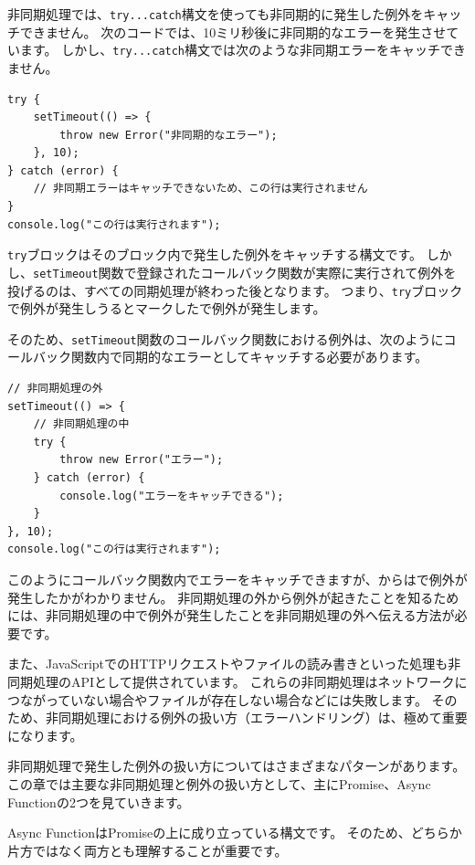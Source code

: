 非同期処理では、\texttt{try...catch}構文を使っても非同期的に発生した例外をキャッチできません。
次のコードでは、10ミリ秒後に非同期的なエラーを発生させています。
しかし、\texttt{try...catch}構文では次のような非同期エラーをキャッチできません。

\begin{lstlisting}
try {
    setTimeout(() => {
        throw new Error("非同期的なエラー");
    }, 10);
} catch (error) {
    // 非同期エラーはキャッチできないため、この行は実行されません
}
console.log("この行は実行されます");
\end{lstlisting}

\texttt{try}ブロックはそのブロック内で発生した例外をキャッチする構文です。
しかし、\texttt{setTimeout}関数で登録されたコールバック関数が実際に実行されて例外を投げるのは、すべての同期処理が終わった後となります。
つまり、\texttt{try}ブロックで例外が発生しうるとマークした\textbf{}で例外が発生します。

そのため、\texttt{setTimeout}関数のコールバック関数における例外は、次のようにコールバック関数内で同期的なエラーとしてキャッチする必要があります。

\begin{lstlisting}
// 非同期処理の外
setTimeout(() => {
    // 非同期処理の中
    try {
        throw new Error("エラー");
    } catch (error) {
        console.log("エラーをキャッチできる");
    }
}, 10);
console.log("この行は実行されます");
\end{lstlisting}

このようにコールバック関数内でエラーをキャッチできますが、\textbf{}からは\textbf{}で例外が発生したかがわかりません。
非同期処理の外から例外が起きたことを知るためには、非同期処理の中で例外が発生したことを非同期処理の外へ伝える方法が必要です。

また、JavaScriptでのHTTPリクエストやファイルの読み書きといった処理も非同期処理のAPIとして提供されています。
これらの非同期処理はネットワークにつながっていない場合やファイルが存在しない場合などには失敗します。
そのため、非同期処理における例外の扱い方（エラーハンドリング）は、極めて重要になります。

非同期処理で発生した例外の扱い方についてはさまざまなパターンがあります。
この章では主要な非同期処理と例外の扱い方として、主にPromise、Async Functionの2つを見ていきます。

Async FunctionはPromiseの上に成り立っている構文です。
そのため、どちらか片方ではなく両方とも理解することが重要です。

